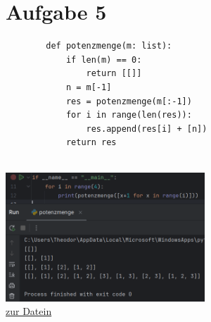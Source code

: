 \documentclass{article}
\begin{document}
\section*{Aufgabe 5}
\begin{minipage}[t]{0.48\textwidth}
    \begin{verbatim}
        def potenzmenge(m: list):
            if len(m) == 0:
                return [[]]
            n = m[-1]
            res = potenzmenge(m[:-1])
            for i in range(len(res)):
                res.append(res[i] + [n])
            return res
    \end{verbatim}
\end{minipage}
\hfill
\begin{minipage}[t]{0.48\textwidth}
    $ $\\
    \includegraphics[width=7.5cm]{A5.png}\\
    \href{https://github.com/paradiseofmadness/KSS/blob/main/potenzmenge.py}{zur Datein}
\end{minipage}
\end{document}
